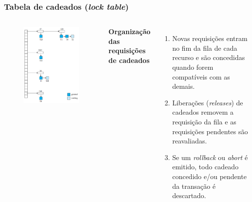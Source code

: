 \documentclass{beamer}
\begin{document}
    
    
\begin{frame} %
    \frametitle{Tabela de cadeados (\emph{lock table})}
    \begin{columns}[c] %
    
        \begin{figure}
            \includegraphics[width=0.8\linewidth]{locktable.png}
        \end{figure}
    
    
        \textbf{Organização das requisições de cadeados}
        \begin{enumerate}
            \item Novas requisições entram no fim da fila de cada recurso e são concedidas quando forem compatíveis com as demais.
            \item Liberações (\emph{releases}) de cadeados removem a requisição da fila e as requisições pendentes são reavaliadas.
            \item Se um \emph{rollback} ou \emph{abort} é emitido, todo cadeado concedido e/ou pendente da transação é descartado.
        \end{enumerate}
    \end{columns}
\end{frame}
\end{document}
